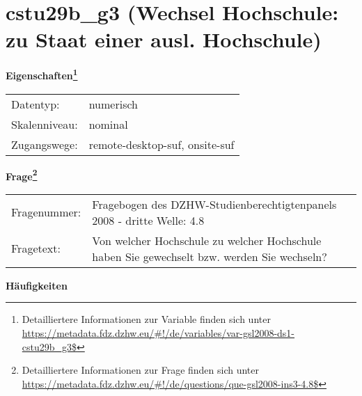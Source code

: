 
    \setcounter{footnote}{0}

    \vspace*{-1.8cm}
	\section{cstu29b\_g3 (Wechsel Hochschule: zu Staat einer ausl. Hochschule)}
	\label{section:cstu29b_g3}



    \vspace*{0.5cm}
    \noindent\textbf{Eigenschaften\footnote{Detailliertere Informationen zur Variable finden sich unter
		\url{https://metadata.fdz.dzhw.eu/\#!/de/variables/var-gsl2008-ds1-cstu29b_g3$}}}\\
	\begin{tabularx}{\hsize}{@{}lX}
	Datentyp: & numerisch \\
	Skalenniveau: & nominal \\
	Zugangswege: &
	  remote-desktop-suf, 
	  onsite-suf
 \\
    \end{tabularx}



				\vspace*{0.5cm}
                \noindent\textbf{Frage\footnote{Detailliertere Informationen zur Frage finden sich unter
		              \url{https://metadata.fdz.dzhw.eu/\#!/de/questions/que-gsl2008-ins3-4.8$}}}\\
				\begin{tabularx}{\hsize}{@{}lX}
					Fragenummer: &
					  Fragebogen des DZHW-Studienberechtigtenpanels 2008 - dritte Welle:
					  4.8
 \\
					Fragetext: & Von welcher Hochschule zu welcher Hochschule haben Sie gewechselt bzw. werden Sie wechseln? \\
				\end{tabularx}





        		\vspace*{0.5cm}
                \noindent\textbf{Häufigkeiten}

